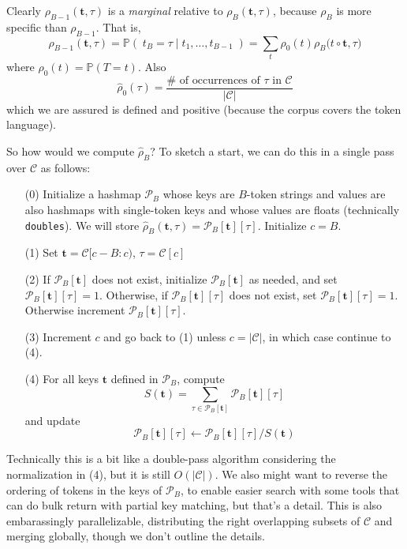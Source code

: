 \documentclass[11pt, oneside]{amsart}   	%
\begin{document}
Clearly $\rho_{B-1}(\mathbf{t}, \tau)$ is a {\em marginal} relative to $\rho_B(\mathbf{t}, \tau)$, because $\rho_B$ is more specific than $\rho_{B-1}$. That is, 
\begin{equation*}
	\rho_{B-1}(\mathbf{t}, \tau) 
		= \mathbb{P}(\; t_{B} = \tau \; | \; t_1, \dotsc , t_{B-1} \; )
		= \sum_t \rho_{0}(t) \rho_B\big( t \circ \mathbf{t}, \tau\big)
\end{equation*}
where $\rho_{0}(t) = \mathbb{P}(T = t)$. Also
\begin{equation*}
	\hat{\rho}_{0}(\tau) = \frac{\#\text{ of occurrences of }\tau\text{ in }\mathcal{C}}{|\mathcal{C}|}
\end{equation*}
which we are assured is defined and positive (because the corpus covers the token language). 

So how would we compute $\hat{\rho}_B$? To sketch a start, we can do this in a single pass over $\mathcal{C}$ as follows: 
\begin{itemize}
	\item[(0)] Initialize a hashmap $\mathcal{P}_B$ whose keys are $B$-token strings and values are also hashmaps with single-token keys and whose values are floats (technically \texttt{doubles}). We will store $\hat{\rho}_B(\mathbf{t},\tau) = \mathcal{P}_B[\mathbf{t}][\tau]$. Initialize $c = B$. 
	\item[(1)] Set $\mathbf{t} = \mathcal{C}[c-B:c)$, $\tau = \mathcal{C}[c]$
	\item[(2)] If $\mathcal{P}_B[\mathbf{t}]$ does not exist, initialize $\mathcal{P}_B[\mathbf{t}]$ as needed, and set $\mathcal{P}_B[\mathbf{t}][\tau] = 1$. Otherwise, if $\mathcal{P}_B[\mathbf{t}][\tau]$ does not exist, set $\mathcal{P}_B[\mathbf{t}][\tau] = 1$. Otherwise increment $\mathcal{P}_B[\mathbf{t}][\tau]$. 
	\item[(3)] Increment $c$ and go back to (1) unless $c = |\mathcal{C}|$, in which case continue to (4). 
	\item[(4)] For all keys $\mathbf{t}$ defined in $\mathcal{P}_B$, compute 
	\begin{equation*}
		S(\mathbf{t}) = \sum_{\tau \in \mathcal{P}_B[\mathbf{t}]} \mathcal{P}_B[\mathbf{t}][\tau]
	\end{equation*}
	and update
	\begin{equation*}
		\mathcal{P}_B[\mathbf{t}][\tau] \leftarrow \mathcal{P}_B[\mathbf{t}][\tau] / S(\mathbf{t})
	\end{equation*}
\end{itemize}
Technically this is a bit like a double-pass algorithm considering the normalization in (4), but it is still $O(|\mathcal{C}|)$. We also might want to reverse the ordering of tokens in the keys of $\mathcal{P}_B$, to enable easier search with some tools that can do bulk return with partial key matching, but that's a detail. This is also embarassingly parallelizable, distributing the right overlapping subsets of $\mathcal{C}$ and merging globally, though we don't outline the details. 
\end{document}

